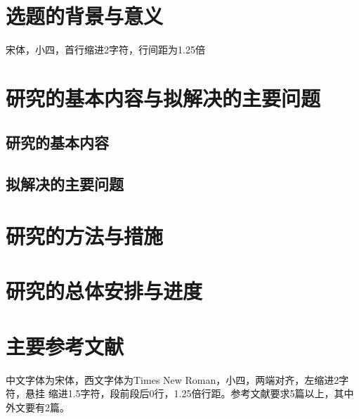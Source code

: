 \section{选题的背景与意义}

\begin{tcolorbox}
	宋体，小四，首行缩进2字符，行间距为1.25倍
\end{tcolorbox}

\lipsum[1]\cite{Bohan1928,chen1980zhongguo}

\section{研究的基本内容与拟解决的主要问题}

\subsection{研究的基本内容}

\lipsum[2-3]\cite{chen2005zhulu,chu2004tushu,yuan2012lanc}

\subsection{拟解决的主要问题}

\lipsum[4]

\section{研究的方法与措施}

\lipsum[5-7]\cite{lamport1986document,niu2013zonghe}

\section{研究的总体安排与进度}

\lipsum[8-11]\cite{wikibook2014latex,Dubrovin1906,hls2012jinji}

\section{主要参考文献}

\begin{tcolorbox}
	中文字体为宋体，西文字体为Times New Roman，小四，两端对齐，左缩进2字符，悬挂
	缩进1.5字符，段前段后0行，1.25倍行距。参考文献要求5篇以上，其中外文要有2篇。
\end{tcolorbox}

